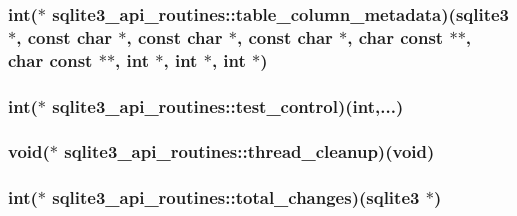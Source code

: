 \hypertarget{structsqlite3__api__routines_a8fdf517f6c889edf0e0206fd8846eba5}{
\subsubsection[{table\-\_\-column\-\_\-metadata}]{\setlength{\rightskip}{0pt plus 5cm}int($\ast$ sqlite3\-\_\-api\-\_\-routines\-::table\-\_\-column\-\_\-metadata)({\bf sqlite3} $\ast$, const char $\ast$, const char $\ast$, const char $\ast$, char const $\ast$$\ast$, char const $\ast$$\ast$, int $\ast$, int $\ast$, int $\ast$)}}\label{structsqlite3__api__routines_a8fdf517f6c889edf0e0206fd8846eba5}
\hypertarget{structsqlite3__api__routines_a5b1a547de99292de4aa0b474ffe3462e}{
\subsubsection[{test\-\_\-control}]{\setlength{\rightskip}{0pt plus 5cm}int($\ast$ sqlite3\-\_\-api\-\_\-routines\-::test\-\_\-control)(int,...)}}\label{structsqlite3__api__routines_a5b1a547de99292de4aa0b474ffe3462e}
\hypertarget{structsqlite3__api__routines_aafef606568e3b1706477c795e343da66}{
\subsubsection[{thread\-\_\-cleanup}]{\setlength{\rightskip}{0pt plus 5cm}void($\ast$ sqlite3\-\_\-api\-\_\-routines\-::thread\-\_\-cleanup)(void)}}\label{structsqlite3__api__routines_aafef606568e3b1706477c795e343da66}
\hypertarget{structsqlite3__api__routines_a5bf72c6b416c8a29ed60940947ce5737}{
\subsubsection[{total\-\_\-changes}]{\setlength{\rightskip}{0pt plus 5cm}int($\ast$ sqlite3\-\_\-api\-\_\-routines\-::total\-\_\-changes)({\bf sqlite3} $\ast$)}}\label{structsqlite3__api__routines_a5bf72c6b416c8a29ed60940947ce5737}
